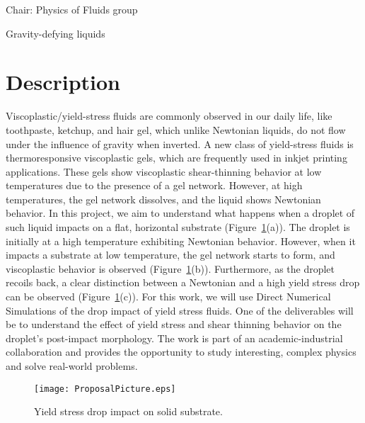 \documentclass[a4paper,10pt]{article}
\begin{document}
 
\thispagestyle{empty} %

\noindent Chair: Physics of Fluids group
\begin{center}
 \begin{LARGE}
  Gravity-defying liquids
 \end{LARGE}
\end{center}

\section*{Description}
Viscoplastic/yield-stress fluids are commonly observed in our daily life, like toothpaste, ketchup, and hair gel, which unlike Newtonian liquids, do not flow under the influence of gravity when inverted. A new class of yield-stress fluids is thermoresponsive viscoplastic gels, which are frequently used in inkjet printing applications. These gels show viscoplastic shear-thinning behavior at low temperatures due to the presence of a gel network. However, at high temperatures, the gel network dissolves, and the liquid shows Newtonian behavior. In this project, we aim to understand what happens when a droplet of such liquid impacts on a flat, horizontal substrate (Figure~\ref{Fig::Fig1}(a)). The droplet is initially at a high temperature exhibiting Newtonian behavior. However, when it impacts a substrate at low temperature, the gel network starts to form, and viscoplastic behavior is observed (Figure~\ref{Fig::Fig1}(b)). Furthermore, as the droplet recoils back, a clear distinction between a Newtonian and a high yield stress drop can be observed (Figure~\ref{Fig::Fig1}(c)). For this work, we will use Direct Numerical Simulations of the drop impact of yield stress fluids. One of the deliverables will be to understand the effect of yield stress and shear thinning behavior on the droplet's post-impact morphology. The work is part of an academic-industrial collaboration and provides the opportunity to study interesting, complex physics and solve real-world problems. 
\begin{figure}[H]
 \begin{center}
  \texttt{[image: ProposalPicture.eps]}
 \end{center}
 \caption{Yield stress drop impact on solid substrate.}
 \label{Fig::Fig1}
\end{figure}
\end{document}
